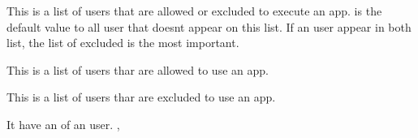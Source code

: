 
\bigskip
{}
{This is a list of users that are allowed or excluded to execute an
  app.  is the default value to all user that
  doesnt appear on this list. If an user appear in both list, the list
of excluded is the most important.}
{}

\bigskip
{}
{This is a list of users thar are allowed to use an app.}
{}

\bigskip
{}
{This is a list of users thar are excluded to use an app.}
{}

\bigskip
{}
{It have an  of an user.}
{, }

